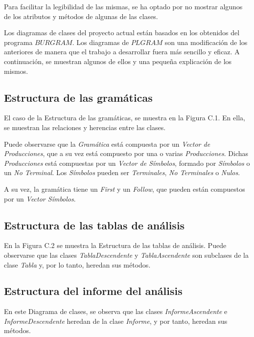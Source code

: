 Para facilitar la legibilidad de las mismas, se ha optado por no mostrar algunos de los atributos y métodos de algunas de las clases.

Los diagramas de clases del proyecto actual están basados en los obtenidos del programa $BURGRAM$. Los diagramas de $PLGRAM$ son una modificación de los anteriores de manera que el trabajo a desarrollar fuera más sencillo y eficaz. A continuación, se muestran algunos de ellos y una pequeña explicación de los mismos.

\subsection{Estructura de las gramáticas}
El caso de la Estructura de las gramáticas, se muestra en la Figura C.1. En ella, se muestran las relaciones y herencias entre las clases.

Puede observarse que la \textit{Gramática} está compuesta por un \textit{Vector de Producciones}, que a su vez está compuesto por una o varias \textit{Producciones}. Dichas \textit{Producciones} está compuestas por un \textit{Vector de Símbolos}, formado por \textit{Símbolos} o un \textit{No Terminal}. Los \textit{Símbolos} pueden ser \textit{Terminales}, \textit{No Terminales} o \textit{Nulos}.

A su vez, la gramática tiene un \textit{First} y un \textit{Follow}, que pueden están compuestos por un \textit{Vector Símbolos}.


\subsection{Estructura de las tablas de análisis}

En la Figura C.2 se muestra la Estructura de las tablas de análisis. Puede observarse que las clases \textit{TablaDescendente} y \textit{TablaAscendente} son subclases de la clase \textit{Tabla} y, por lo tanto, heredan sus métodos.


\subsection{Estructura del informe del análisis}

En este Diagrama de clases, se observa que las clases \textit{InformeAscendente} e \textit{InformeDescendente} heredan de la clase \textit{Informe}, y por tanto, heredan sus métodos.

